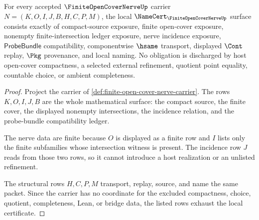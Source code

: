 \begin{theorem}
\label{thm:finite-open-cover-nerve-namecert-obligations}
For every accepted $\FiniteOpenCoverNerveUp$ carrier $N=(K,O,I,J,B,H,C,P,M)$, the local $\NameCert_{\FiniteOpenCoverNerveUp}$ surface consists exactly of compact-source exposure, finite open-cover exposure, nonempty finite-intersection ledger exposure, nerve incidence exposure, $\mathsf{ProbeBundle}$ compatibility, componentwise $\hsame$ transport, displayed $\Cont$ replay, $\Pkg$ provenance, and local naming. No obligation is discharged by host open-cover compactness, a selected external refinement, quotient point equality, countable choice, or ambient completeness.
\end{theorem}
\begin{proof}
Project the carrier of \autoref{def:finite-open-cover-nerve-carrier}. The rows $K,O,I,J,B$ are the whole mathematical surface: the compact source, the finite cover, the displayed nonempty intersections, the incidence relation, and the probe-bundle compatibility ledger.

The nerve data are finite because $O$ is displayed as a finite row and $I$ lists only the finite subfamilies whose intersection witness is present. The incidence row $J$ reads from those two rows, so it cannot introduce a host realization or an unlisted refinement.

The structural rows $H,C,P,M$ transport, replay, source, and name the same packet. Since the carrier has no coordinate for the excluded compactness, choice, quotient, completeness, Lean, or bridge data, the listed rows exhaust the local certificate.
\end{proof}

